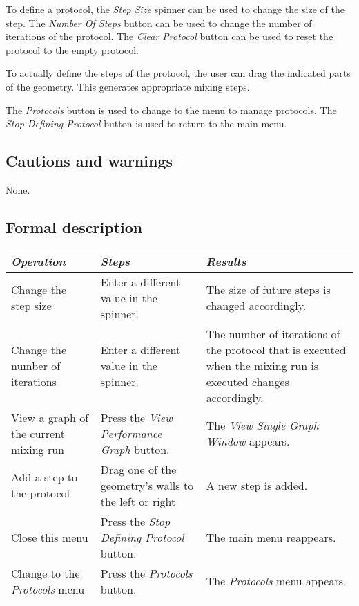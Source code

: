   To define a protocol, the \emph{Step Size} spinner can be used to change the size of the step. The \emph{Number Of Steps} button can be used to change the number of iterations of the protocol. The \emph{Clear Protocol} button can be used to reset the protocol to the empty protocol.
  
  To actually define the steps of the protocol, the user can drag the indicated parts of the geometry. This generates appropriate mixing steps.
  
  The \emph{Protocols} button is used to change to the menu to manage protocols. The \emph{Stop Defining Protocol} button is used to return to the main menu.

  \subsection*{Cautions and warnings}
  None.

  \subsection*{Formal description}
  \begin{tabularx}{\textwidth}{XXX}
    \toprule
    \emph{Operation} & \emph{Steps} & \emph{Results} \\
    \midrule
    Change the step size & Enter a different value in the spinner. & The size of future steps is changed accordingly. \\
    \midrule
    Change the number of iterations & Enter a different value in the spinner. & The number of iterations of the protocol that is executed when the mixing run is executed changes accordingly. \\
    \midrule
    View a graph of the current mixing run & Press the \emph{View Performance Graph} button. & The \emph{View Single Graph Window} appears. \\
    \midrule
    Add a step to the protocol & Drag one of the geometry's walls to the left or right & A new step is added. \\
    \midrule
    Close this menu & Press the \emph{Stop Defining Protocol} button. & The main menu reappears. \\
    \midrule
    Change to the \emph{Protocols} menu & Press the \emph{Protocols} button. & The \emph{Protocols} menu appears. \\
    \bottomrule
  \end{tabularx}
  
  
